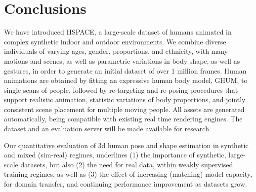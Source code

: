 \documentclass[10pt,twocolumn,letterpaper]{article}
\begin{document}
\section{Conclusions}

We have introduced HSPACE, a large-scale dataset of humans animated in complex synthetic indoor and outdoor environments. We combine diverse individuals of varying ages, gender, proportions, and ethnicity, with many motions and scenes, as well as parametric variations in body shape, as well as gestures, in order to generate an initial dataset of over 1 million frames. Human animations are obtained by fitting an expressive human body model, GHUM, to single scans of people, followed by re-targeting and re-posing procedures that support realistic animation, statistic variations of body proportions, and jointly consistent scene placement for multiple moving people. All assets are generated automatically, 
being compatible with existing real time rendering engines. 
The dataset and an evaluation server will be made available for research.

Our quantitative evaluation of 3d human pose and shape estimation in synthetic and mixed (sim-real) regimes, underlines (1) the importance of synthetic, large-scale datasets, but also (2) the need for real data, within weakly supervised training regimes, as well as (3) the effect of increasing (matching) model capacity, for domain transfer, and continuing performance improvement as datasets grow. 


{\small


}
\end{document}
